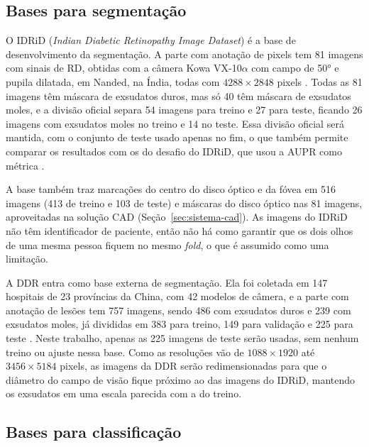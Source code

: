 \subsection{Bases para segmentação}
\label{sec:bases-segmentacao}

O IDRiD (\textit{Indian Diabetic Retinopathy Image Dataset}) é a base de desenvolvimento da segmentação. A parte com anotação de pixels tem 81 imagens com sinais de RD, obtidas com a câmera Kowa VX-10$\alpha$ com campo de 50° e pupila dilatada, em Nanded, na Índia, todas com $4288 \times 2848$ pixels \cite{porwal2018idrid}. Todas as 81 imagens têm máscara de exsudatos duros, mas só 40 têm máscara de exsudatos moles, e a divisão oficial separa 54 imagens para treino e 27 para teste, ficando 26 imagens com exsudatos moles no treino e 14 no teste. Essa divisão oficial será mantida, com o conjunto de teste usado apenas no fim, o que também permite comparar os resultados com os do desafio do IDRiD, que usou a AUPR como métrica \cite{porwal2020idrid}.

A base também traz marcações do centro do disco óptico e da fóvea em 516 imagens (413 de treino e 103 de teste) e máscaras do disco óptico nas 81 imagens, aproveitadas na solução CAD (Seção~\ref{sec:sistema-cad}). As imagens do IDRiD não têm identificador de paciente, então não há como garantir que os dois olhos de uma mesma pessoa fiquem no mesmo \textit{fold}, o que é assumido como uma limitação.

A DDR entra como base externa de segmentação. Ela foi coletada em 147 hospitais de 23 províncias da China, com 42 modelos de câmera, e a parte com anotação de lesões tem 757 imagens, sendo 486 com exsudatos duros e 239 com exsudatos moles, já divididas em 383 para treino, 149 para validação e 225 para teste \cite{li2019ddr}. Neste trabalho, apenas as 225 imagens de teste serão usadas, sem nenhum treino ou ajuste nessa base. Como as resoluções vão de $1088 \times 1920$ até $3456 \times 5184$ pixels, as imagens da DDR serão redimensionadas para que o diâmetro do campo de visão fique próximo ao das imagens do IDRiD, mantendo os exsudatos em uma escala parecida com a do treino.

\subsection{Bases para classificação}
\label{sec:bases-classificacao}

